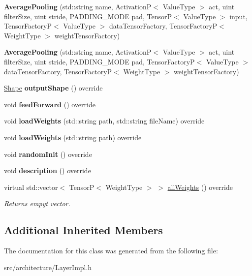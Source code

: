 \begin{DoxyCompactItemize}
\item 
\mbox{\label{classAveragePooling_a17b7f49f29b6f6334cb023bd59fa5232}} 
{\bfseries Average\+Pooling} (std\+::string name, ActivationP$<$ Value\+Type $>$ act, uint filter\+Size, uint stride, P\+A\+D\+D\+I\+N\+G\+\_\+\+M\+O\+DE pad, TensorP$<$ Value\+Type $>$ input, Tensor\+FactoryP$<$ Value\+Type $>$ data\+Tensor\+Factory, Tensor\+FactoryP$<$ Weight\+Type $>$ weight\+Tensor\+Factory)
\item 
\mbox{\label{classAveragePooling_ae15db952116ae7491c789a4b9c2e91e2}} 
{\bfseries Average\+Pooling} (std\+::string name, ActivationP$<$ Value\+Type $>$ act, uint filter\+Size, uint stride, P\+A\+D\+D\+I\+N\+G\+\_\+\+M\+O\+DE pad, Tensor\+FactoryP$<$ Value\+Type $>$ data\+Tensor\+Factory, Tensor\+FactoryP$<$ Weight\+Type $>$ weight\+Tensor\+Factory)
\item 
\mbox{\label{classAveragePooling_a12b3ae240455ee32a7fa0e567983efc6}} 
\hyperlink{classShape}{Shape} {\bfseries output\+Shape} () override
\item 
\mbox{\label{classAveragePooling_a2111ac4ecad38c8d536a7c763ec2ad41}} 
void {\bfseries feed\+Forward} () override
\item 
\mbox{\label{classAveragePooling_a7da9d260bae8a8d9f00ceb8b53939ab5}} 
void {\bfseries load\+Weights} (std\+::string path, std\+::string file\+Name) override
\item 
\mbox{\label{classAveragePooling_a4d8456525db187a9521c476b25ca41d9}} 
void {\bfseries load\+Weights} (std\+::string path) override
\item 
\mbox{\label{classAveragePooling_ab115808921472b438c06b1408532e7c4}} 
void {\bfseries random\+Init} () override
\item 
\mbox{\label{classAveragePooling_a51cae671de031a32d951846b34f21264}} 
void {\bfseries description} () override
\item 
\mbox{\label{classAveragePooling_a3db0eee227862f0c6c04f68da7d9d879}} 
virtual std\+::vector$<$ TensorP$<$ Weight\+Type $>$ $>$ \hyperlink{classAveragePooling_a3db0eee227862f0c6c04f68da7d9d879}{all\+Weights} () override
\begin{DoxyCompactList}\small\item\em Returns empyt vector. \end{DoxyCompactList}\end{DoxyCompactItemize}
\subsection*{Additional Inherited Members}


The documentation for this class was generated from the following file\+:\begin{DoxyCompactItemize}
\item 
src/architecture/Layer\+Impl.\+h\end{DoxyCompactItemize}
